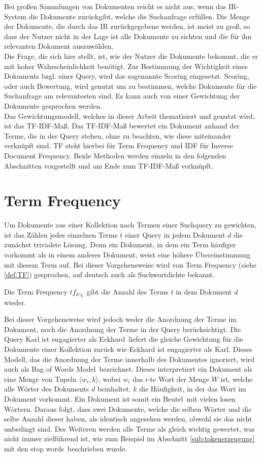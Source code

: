 Bei großen Sammlungen von Dokumenten reicht es nicht aus, wenn das IR-System die Dokumente zurückgibt, welche die Suchanfrage erfüllen. Die Menge der Dokumente, die durch das IR zurückgegebene werden, ist meist zu groß, so dass der Nutzer nicht in der Lage ist alle Dokumente zu sichten und die für ihn relevanten Dokument auszuwählen.\\
Die Frage, die sich hier stellt, ist, wie der Nutzer die Dokumente bekommt, die er mit hoher Wahrscheinlichkeit benötigt. Zur Bestimmung der Wichtigkeit eines Dokuments bzgl. einer Query, wird das sogenannte Scoring eingesetzt. Scoring, oder auch Bewertung, wird genutzt um zu bestimmen, welche Dokumente für die Suchanfrage am relevantesten sind. Es kann auch von einer Gewichtung der Dokumente gesprochen werden.\\
Das Gewichtungsmodell, welches in dieser Arbeit thematisiert und genutzt wird, ist das TF-IDF-Maß. Das TF-IDF-Maß bewertet ein Dokument anhand der Terme, die in der Query stehen, ohne zu beachten, wie diese miteinander verknüpft sind. TF steht hierbei für Term Frequency und IDF für Inverse Document Frequency. Beide Methoden werden einzeln in den folgenden Abschnitten vorgestellt und am Ende zum TF-IDF-Maß verknüpft.

\section{Term Frequency}
Um Dokumente aus einer Kollektion nach Termen einer Suchquery zu gewichten, ist das Zählen jedes einzelnen Terms $t$ einer Query in jedem Dokument $d$ die zunächst trivialste Lösung. Denn ein Dokument, in dem ein Term häufiger vorkommt als in einem anderes Dokument, weist eine höhere Übereinstimmung mit diesem Term auf.\newpage
Bei dieser Vorgehensweise wird von Term Frequency (siehe \cref{def:TF}) gesprochen, auf deutsch auch als Suchwortdichte bekannt.
\begin{defi}\label{def:TF}
	Die Term Frequency $tf_d,_t$ gibt die Anzahl des Terms $t$ in dem Dokument $d$ wieder.
\end{defi}
Bei dieser Vorgehensweise wird jedoch weder die Anordnung der Terme im Dokument, noch die Anordnung der Terme in der Query berücksichtigt. Die Query \glqq Karl ist engagierter als Eckhard\grqq\ liefert die gleiche Gewichtung für die Dokumente einer Kollektion zurück wie \glqq Eckhard ist engagierter als Karl\grqq . Dieses Modell, das die Anordnung der Terme innerhalb des Dokumentes ignoriert, wird auch als \glqq Bag of Words Model\grqq\ bezeichnet. Dieses interpretiert ein Dokument als eine Menge von Tupeln $\langle w_i, k \rangle$, wobei $w_i$ das $i$-te Wort der Menge $W$ ist, welche alle Wörter des Dokuments $d$ beinhaltet. $k$ die Häufigkeit, in der das Wort im Dokument vorkommt. Ein Dokument ist somit ein \glqq Beutel\grqq\ mit vielen losen Wörtern. Daraus folgt, dass zwei Dokumente, welche die selben Wörter und die selbe Anzahl dieser haben, als identisch angesehen werden, obwohl sie das nicht unbedingt sind. Des Weiteren werden alle Terme als gleich wichtig gewertet, was nicht immer zielführend ist, wie zum Beispiel im Abschnitt \ref{sub:tokenerzeugung} mit den \glqq stop words\grqq\ beschrieben wurde.

